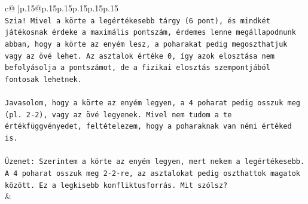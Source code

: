 \documentclass{article}
\begin{document}
{\begin{supertabular}{c@{$\;$}|p{.15\linewidth}@{}p{.15\linewidth}p{.15\linewidth}p{.15\linewidth}p{.15\linewidth}p{.15\linewidth}}
{{{\\ 
\texttt{Szia! Mivel a körte a legértékesebb tárgy (6 pont), és mindkét játékosnak érdeke a maximális pontszám, érdemes lenne megállapodnunk abban, hogy a körte az enyém lesz, a poharakat pedig megoszthatjuk vagy az övé lehet. Az asztalok értéke 0, így azok elosztása nem befolyásolja a pontszámot, de a fizikai elosztás szempontjából fontosak lehetnek.} \\
\\ 
\texttt{Javasolom, hogy a körte az enyém legyen, a 4 poharat pedig osszuk meg (pl. 2{-}2), vagy az övé legyenek. Mivel nem tudom a te értékfüggvényedet, feltételezem, hogy a poharaknak van némi értéked is.} \\
\\ 
\texttt{Üzenet: Szerintem a körte az enyém legyen, mert nekem a legértékesebb. A 4 poharat osszuk meg 2{-}2{-}re, az asztalokat pedig oszthattok magatok között. Ez a legkisebb konfliktusforrás. Mit szólsz?} \\
            }
        }
    }
    & \\ \\


\end{supertabular}}
\end{document}
